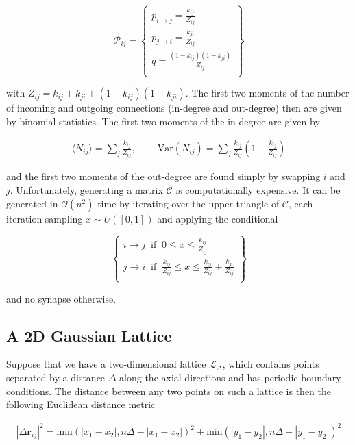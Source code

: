 \documentclass{ucetd}
\begin{document}
  \[
    \mathcal{P}_{ij} = \left\{\begin{array}{lr}
        p_{i\rightarrow j} = \frac{k_{ij}}{Z_{ij}}\\
        p_{j\rightarrow i} = \frac{k_{ji}}{Z_{ij}}\\
        q = \frac{(1-k_{ij})(1-k_{ji})}{Z_{ij}}\\
        \end{array}\right\}
  \]

with $Z_{ij} = k_{ij} + k_{ji} + (1-k_{ij})(1-k_{ji})$. The first two moments of  the number of incoming and outgoing connections (in-degree and out-degree) then are given by binomial statistics. The first two moments of the in-degree are given by

\begin{align*}
\langle N_{ij} \rangle = \sum_{j} \frac{k_{ij}}{Z_{ij}},\;\;\;\;\;\;\;\; \mathrm{Var}(N_{ij}) = \sum_{j} \frac{k_{ij}}{Z_{ij}}\left(1-\frac{k_{ij}}{Z_{ij}}\right)
\end{align*}

and the first two moments of the out-degree are found simply by swapping $i$ and $j$. Unfortunately, generating a matrix $\mathcal{C}$ is computationally expensive. It can be generated in $\mathcal{O}(n^{2})$ time by iterating over the upper triangle of $\mathcal{C}$, each iteration sampling $x\sim U([0,1])$ and applying the conditional

  \[
    \left\{\begin{array}{lr}
        i\rightarrow j \;\;\mathrm{if}\;\; 0 \leq x \leq \frac{k_{ij}}{Z_{ij}}\\
        j\rightarrow i \;\;\mathrm{if}\;\; \frac{k_{ij}}{Z_{ij}} \leq x \leq \frac{k_{ij}}{Z_{ij}} + \frac{k_{ji}}{Z_{ij}}\\
        \end{array}\right\}
  \]

and no synapse otherwise.


\subsection{A 2D Gaussian Lattice}

Suppose that we have a two-dimensional lattice $\mathcal{L}_{\Delta}$, which contains points separated by a distance $\Delta$ along the axial directions and has periodic boundary conditions. The distance between any two points on such a lattice is then the following Euclidean distance metric

\begin{align*}
|\Delta\mathbf{r}_{ij}|^{2} = \mathrm{min}(|x_1 - x_2|, n\Delta - |x_1 - x_2|)^2 + \mathrm{min}(|y_1 - y_2|, n\Delta - |y_1 - y_2|)^2
\end{align*}
\end{document}
